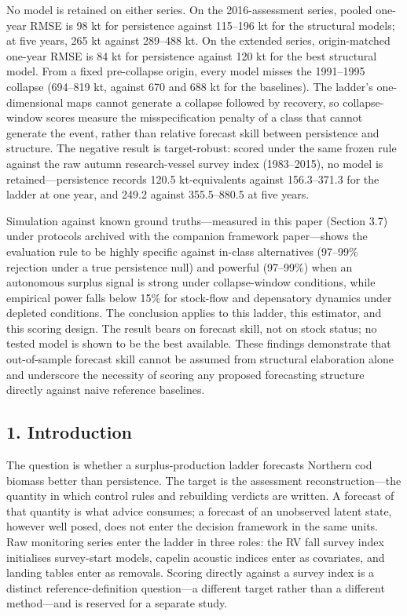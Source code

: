 \documentclass[11pt]{article}
\begin{document}
No model is retained on either series. On the 2016-assessment series,
pooled one-year RMSE is 98 kt for persistence against 115--196 kt for
the structural models; at five years, 265 kt against 289--488 kt. On the
extended series, origin-matched one-year RMSE is 84 kt for persistence
against 120 kt for the best structural model. From a fixed pre-collapse
origin, every model misses the 1991--1995 collapse (694--819 kt, against
670 and 688 kt for the baselines). The ladder's one-dimensional maps
cannot generate a collapse followed by recovery, so collapse-window
scores measure the misspecification penalty of a class that cannot
generate the event, rather than relative forecast skill between
persistence and structure. The negative result is target-robust: scored
under the same frozen rule against the raw autumn research-vessel survey
index (1983--2015), no model is retained---persistence records 120.5
kt-equivalents against 156.3--371.3 for the ladder at one year, and
249.2 against 355.5--880.5 at five years.

Simulation against known ground truths---measured in this paper (Section
3.7) under protocols archived with the companion framework paper---shows
the evaluation rule to be highly specific against in-class alternatives
(97--99\% rejection under a true persistence null) and powerful
(97--99\%) when an autonomous surplus signal is strong under
collapse-window conditions, while empirical power falls below 15\% for
stock-flow and depensatory dynamics under depleted conditions. The
conclusion applies to this ladder, this estimator, and this scoring
design. The result bears on forecast skill, not on stock status; no
tested model is shown to be the best available. These findings
demonstrate that out-of-sample forecast skill cannot be assumed from
structural elaboration alone and underscore the necessity of scoring any
proposed forecasting structure directly against naive reference
baselines.

\subsection{1. Introduction}\label{introduction}

The question is whether a surplus-production ladder forecasts Northern
cod biomass better than persistence. The target is the assessment
reconstruction---the quantity in which control rules and rebuilding
verdicts are written. A forecast of that quantity is what advice
consumes; a forecast of an unobserved latent state, however well posed,
does not enter the decision framework in the same units. Raw monitoring
series enter the ladder in three roles: the RV fall survey index
initialises survey-start models, capelin acoustic indices enter as
covariates, and landing tables enter as removals. Scoring directly
against a survey index is a distinct reference-definition question---a
different target rather than a different method---and is reserved for a
separate study.
\end{document}
